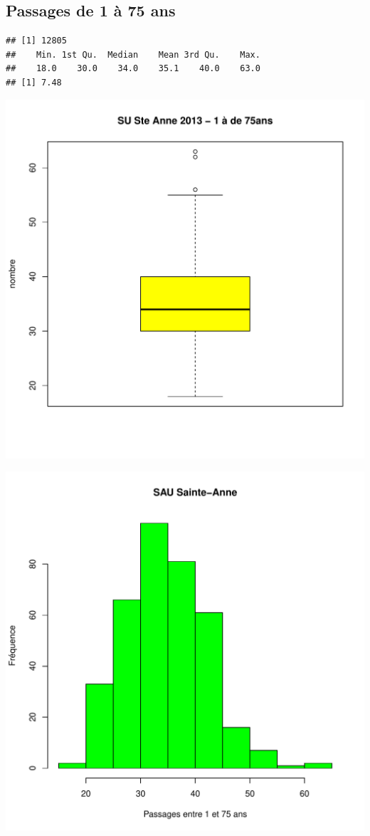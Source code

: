 \documentclass[12pt,english,french,twoside]{report}\usepackage[]{graphicx}\usepackage[]{color}
\makeatletter
\def\maxwidth{ %
  \ifdim\Gin@nat@width>\linewidth
    \linewidth
  \else
    \Gin@nat@width
  \fi
}
\newenvironment{kframe}{%
 \def\at@end@of@kframe{}%
 \ifinner\ifhmode%
  \def\at@end@of@kframe{\end{minipage}}%
  \begin{minipage}{\columnwidth}%
 \fi\fi%
 \def\FrameCommand##1{\hskip\@totalleftmargin \hskip-\fboxsep
 \colorbox{shadecolor}{##1}\hskip-\fboxsep
     \hskip-\linewidth \hskip-\@totalleftmargin \hskip\columnwidth}%
 \MakeFramed {\advance\hsize-\width
   \@totalleftmargin\z@ \linewidth\hsize
   \@setminipage}}%
 {\par\unskip\endMakeFramed%
 \at@end@of@kframe}
\newenvironment{knitrout}{}{} %
\makeatother
\begin{document}
\subsection{Passages de 1 à 75 ans}

\begin{knitrout}
\color{fgcolor}\begin{kframe}
\begin{verbatim}
## [1] 12805
##    Min. 1st Qu.  Median    Mean 3rd Qu.    Max. 
##    18.0    30.0    34.0    35.1    40.0    63.0
## [1] 7.48
\end{verbatim}
\end{kframe}
\includegraphics[width=\maxwidth]{figure/stAnne_1_75_passages1} 

\includegraphics[width=\maxwidth]{figure/stAnne_1_75_passages2} 


\end{knitrout}
\end{document}
